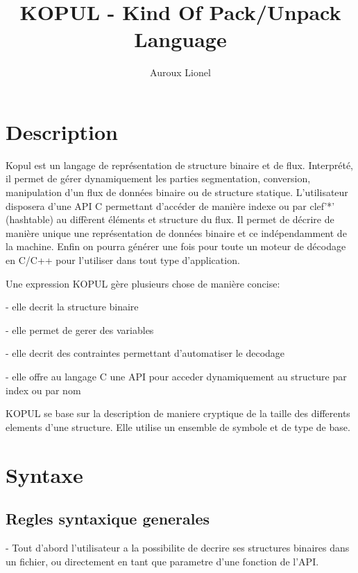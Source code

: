 \documentclass[11pt]{report}
\begin{document}
\author{Auroux Lionel}
\title{KOPUL - Kind Of Pack/Unpack Language}
\maketitle

\section{Description}
Kopul est un langage de représentation de structure binaire et de flux.
Interprété, il permet de gérer dynamiquement les parties segmentation,
conversion, manipulation d'un flux de données binaire ou de structure statique.
L'utilisateur disposera d'une API C permettant d'accéder de manière indexe ou
par clef'*' (hashtable) au diffèrent éléments et structure du flux.
Il permet de décrire de manière unique une représentation de données binaire
et ce indépendamment de la machine. Enfin on pourra générer une fois pour toute
un moteur de décodage en C/C++ pour l'utiliser dans tout type d'application.

Une expression KOPUL gère plusieurs chose de manière concise:
\begin{description}
	\item{- elle decrit la structure binaire}
	\item{- elle permet de gerer des variables}
	\item{- elle decrit des contraintes permettant d'automatiser le decodage}
	\item{- elle offre au langage C une API pour acceder dynamiquement au
		structure par index ou par nom}
\end{description}

KOPUL se base sur la description de maniere cryptique de la taille des differents
elements d'une structure. Elle utilise un ensemble de symbole et de type de
base.

\section{Syntaxe}
\subsection{Regles syntaxique generales}
- Tout d'abord l'utilisateur a la possibilite de decrire ses structures binaires
dans un fichier, ou directement en tant que parametre d'une fonction de l'API.
\end{document}
